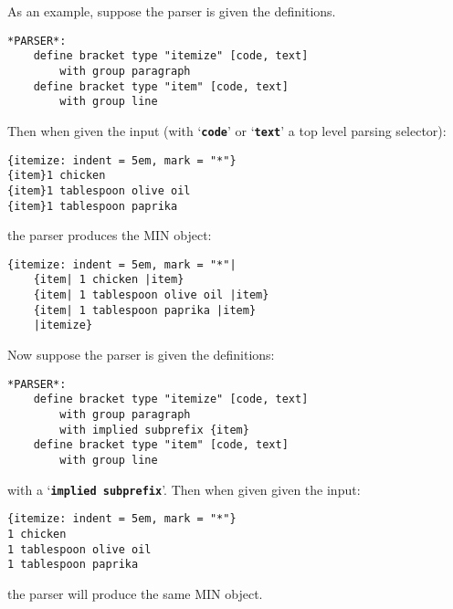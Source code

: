 \documentclass[12pt]{article}
\newcommand{\TT}[1]{{\tt \bfseries #1}}
\newenvironment{indpar}[1][0.3in]%
	{\begin{list}{}%
		     {\setlength{\itemsep}{0in}%
		      \setlength{\topsep}{0in}%
		      \setlength{\parsep}{1ex}%
		      \setlength{\labelwidth}{#1}%
		      \setlength{\leftmargin}{#1}%
		      \addtolength{\leftmargin}{\labelsep}}%
	 \item}%
	{\end{list}}
\begin{document}
As an example, suppose the parser is given the definitions.
\begin{indpar}\begin{verbatim}
*PARSER*:
    define bracket type "itemize" [code, text]
        with group paragraph
    define bracket type "item" [code, text]
        with group line
\end{verbatim}\end{indpar}
Then when given the input (with `\TT{code}' or `\TT{text}'
a top level parsing selector):
\begin{indpar}\begin{verbatim}
{itemize: indent = 5em, mark = "*"}
{item}1 chicken
{item}1 tablespoon olive oil
{item}1 tablespoon paprika
\end{verbatim}\end{indpar}
the parser produces the MIN object:
\begin{indpar}\begin{verbatim}
{itemize: indent = 5em, mark = "*"|
    {item| 1 chicken |item}
    {item| 1 tablespoon olive oil |item}
    {item| 1 tablespoon paprika |item}
    |itemize}
\end{verbatim}\end{indpar}

Now suppose the parser is given the definitions:
\begin{indpar}\begin{verbatim}
*PARSER*:
    define bracket type "itemize" [code, text]
        with group paragraph
        with implied subprefix {item}
    define bracket type "item" [code, text]
        with group line
\end{verbatim}\end{indpar}
with a `\TT{implied subprefix}'.  Then when given given the input:
\begin{indpar}\begin{verbatim}
{itemize: indent = 5em, mark = "*"}
1 chicken
1 tablespoon olive oil
1 tablespoon paprika
\end{verbatim}\end{indpar}
the parser will produce the same MIN object.
\end{document}
